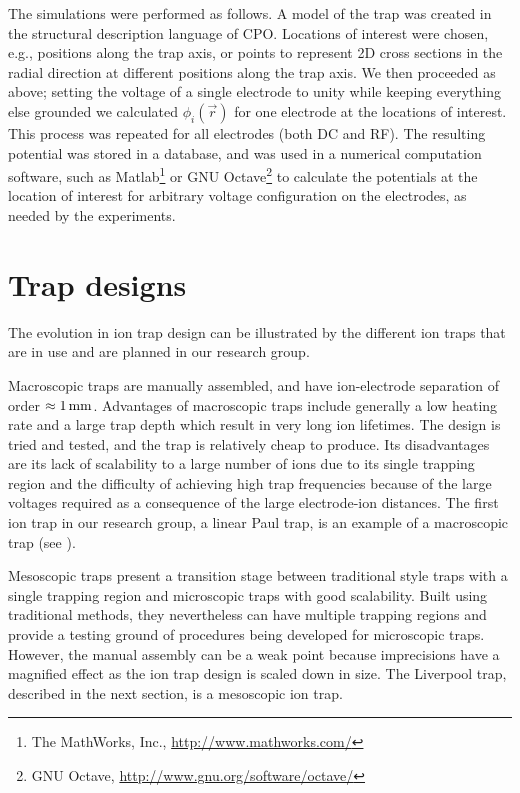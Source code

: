 The simulations were performed as follows. A model of the trap was created in the structural description language of CPO.  Locations of interest were chosen, e.g., positions along the trap axis, or points to represent 2D cross sections in the radial direction at different positions along the trap axis. We then proceeded as above; setting the voltage of a single electrode to unity while keeping everything else grounded we calculated $\phi_i(\vec{r})$ for one electrode at the locations of interest. This process was repeated for all electrodes (both DC and RF). The resulting potential was stored in a database, and was used in a numerical computation software, such as Matlab\footnote{The MathWorks, Inc., \url{http://www.mathworks.com/}} or GNU Octave\footnote{GNU Octave, \url{http://www.gnu.org/software/octave/}} to calculate the potentials at the location of interest for arbitrary voltage configuration on the electrodes, as needed by the experiments.


\section{Trap designs}

The evolution in ion trap design can be illustrated by the different ion traps that are in use and are planned in our research group. 

Macroscopic traps are manually assembled, and have ion-electrode separation of order $\approx 1\,\mbox{mm}$. Advantages of macroscopic traps include generally a low heating rate and a large trap depth which result in very long ion lifetimes. The design is tried and tested, and the trap is relatively cheap to produce. Its disadvantages are its lack of scalability to a large number of ions due to its single trapping region and the difficulty of achieving high trap frequencies because of the large voltages required as a consequence of the large electrode-ion distances. The first ion trap in our research group, a linear Paul trap, is an example of a macroscopic trap (see \cite{Barton2000}).

Mesoscopic traps present a transition stage between traditional style traps with a single trapping region and microscopic traps with good scalability. Built using traditional methods, they nevertheless can have multiple trapping regions and provide a testing ground of procedures being developed for microscopic traps. However, the manual assembly can be a  weak point because imprecisions have a magnified effect as the ion trap design is scaled down in size. The Liverpool trap, described in the next section, is a mesoscopic ion trap.

